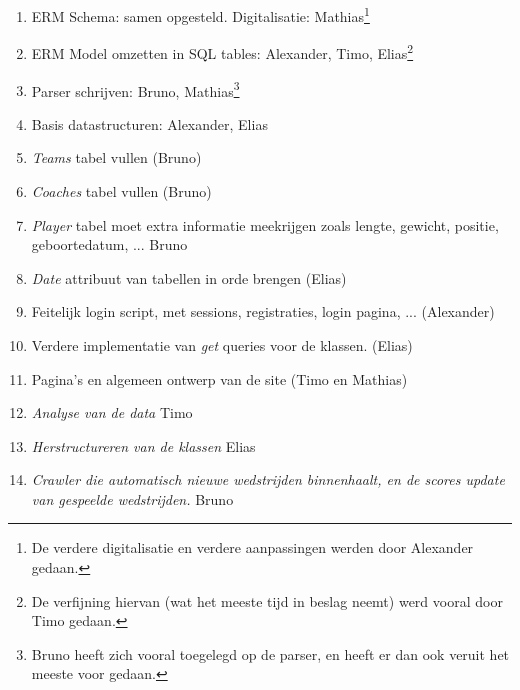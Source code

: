\documentclass[11pt]{article}
\begin{document}
\begin{enumerate}
    
        \item ERM Schema: samen opgesteld. Digitalisatie: Mathias\footnote{De verdere digitalisatie en verdere aanpassingen werden door Alexander gedaan.}
        
        \item ERM Model omzetten in SQL tables: Alexander, Timo, Elias\footnote{De verfijning hiervan (wat het meeste tijd in beslag neemt) werd vooral door Timo gedaan.}
        
        \item Parser schrijven: Bruno, Mathias\footnote{Bruno heeft zich vooral toegelegd op de parser, en heeft er dan ook veruit het meeste voor gedaan.}
        
        \item Basis datastructuren: Alexander, Elias
        
        \item \emph{Teams} tabel vullen (Bruno)
        
        \item \emph{Coaches} tabel vullen (Bruno)
        
        \item \emph{Player} tabel moet extra informatie meekrijgen zoals lengte, gewicht, positie, geboortedatum, ... Bruno
        
        \item \emph{Date} attribuut van tabellen in orde brengen (Elias)
        
        \item Feitelijk login script, met sessions, registraties, login pagina, ... (Alexander)
        
        \item Verdere implementatie van \emph{get} queries voor de klassen. (Elias)
    
        \item Pagina's en algemeen ontwerp van de site (Timo en Mathias)
        
        \item \emph{Analyse van de data} Timo
        
        \item \emph{Herstructureren van de klassen} Elias      
        
        \item \emph{Crawler die automatisch nieuwe wedstrijden binnenhaalt, en de scores update van gespeelde wedstrijden.} Bruno


\end{enumerate}
\end{document}
